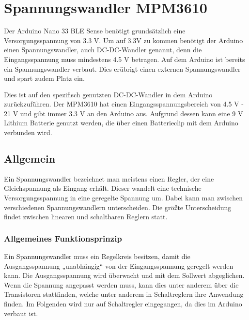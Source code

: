 %
%


\chapter{Spannungswandler MPM3610}

Der Arduino Nano 33 BLE Sense benötigt grundsätzlich eine Versorgungsspannung von 3.3 V. Um auf 3.3V zu kommen benötigt der Arduino einen Spannungswandler, auch DC-DC-Wandler genannt, denn die Eingangsspannung muss mindestens 4.5 V betragen. Auf dem Arduino ist bereits ein Spannungswandler verbaut. Dies erübrigt einen externen Spannungswandler und spart zudem Platz ein. \cite{Arduino:2025Nano}

\bigskip

Dies ist auf den spezifisch genutzten DC-DC-Wandler in dem Arduino zurückzuführen. Der MPM3610 hat einen Eingangsspannungsbereich von 4.5  V - 21 V und gibt immer 3.3 V an den Arduino aus. Aufgrund dessen kann eine 9 V Lithium Batterie genutzt werden, die über einen Batterieclip mit dem Arduino verbunden wird. \cite{Arduino:2025Nano} \cite{MPS:2015}

\section{Allgemein}

Ein Spannungswandler bezeichnet man meistens einen Regler, der eine Gleichspannung als Eingang erhält. Dieser wandelt eine technische Versorgungsspannung in eine geregelte Spannung um.  Dabei kann man zwischen verschiedenen Spannungswandlern unterscheiden. Die größte Unterscheidung findet zwischen linearen und schaltbaren Reglern statt. \cite{Ekbert:2014}

\subsection{Allgemeines Funktionsprinzip}

Ein Spannungswandler muss ein Regelkreis besitzen, damit die Ausgangsspannung „unabhängig“ von der Eingangsspannung geregelt werden kann. Die Ausgangsspannung wird überwacht und mit dem Sollwert abgeglichen. Wenn die Spannung angepasst werden muss, kann dies unter anderem über die Transistoren stattfinden, welche unter anderem in Schaltreglern ihre Anwendung finden. Im Folgenden wird nur auf Schaltregler eingegangen, da dies im Arduino verbaut ist.  \cite{Ekbert:2014} \cite{Arduino:2025Nano}



